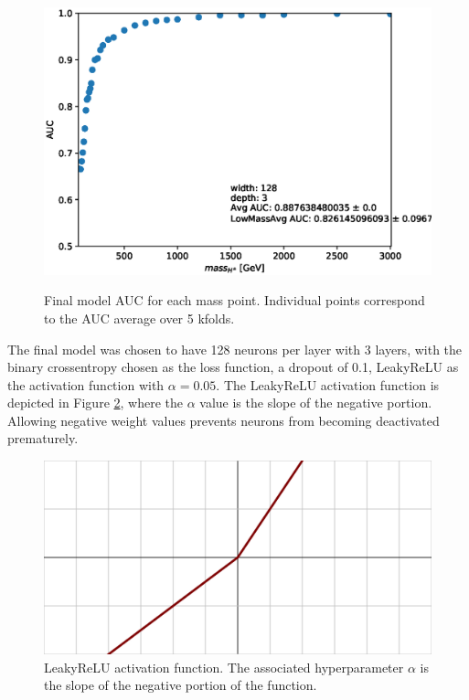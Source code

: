 			\clearpage
			\begin{figure}
			  \centering
			  \includegraphics[width=\textwidth,keepaspectratio=true]{chapters/chapter6_Hplus/images/AUC_Plots/model_GB_1024_channel_taulep_mass_80to3000_ntracks_1_nfolds_5_fold_4_nvars_19_batch_size_1024_epochs_1000_dense_layer_size_128_activation_function_LeakyRelu_depth_3_loss_binary_crossentropy_dropout_0.1_alpha_0.05.eps}\\
			  \caption{Final model AUC for each mass point. Individual points correspond to the AUC average over 5 kfolds. }
			  \label{fig:final-auc}
			\end{figure}

			The final model was chosen to have 128 neurons per layer with 3 layers, with the binary crossentropy chosen as the loss function, a dropout of 0.1, LeakyReLU as the activation function with $\alpha=0.05$. The LeakyReLU activation function is depicted in Figure \ref{fig:leaky-relu}, where the $\alpha$ value is the slope of the negative portion. Allowing negative weight values prevents neurons from becoming deactivated prematurely.

			\begin{figure}
				\centering
				\includegraphics[width=.4\textwidth,keepaspectratio=true]{chapters/chapter6_HPlus/images/Activation_prelu.svg.png}
				\caption{LeakyReLU activation function. The associated hyperparameter $\alpha$ is the slope of the negative portion of the function.}
				\label{fig:leaky-relu}
			\end{figure}

